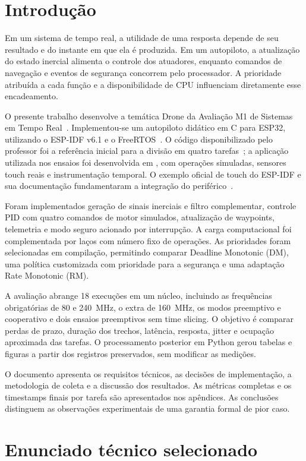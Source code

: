 \section{Introdução}
\label{sec:introducao}

Em um sistema de tempo real, a utilidade de uma resposta depende de seu resultado e do instante em que ela é produzida. Em um autopiloto, a atualização do estado inercial alimenta o controle dos atuadores, enquanto comandos de navegação e eventos de segurança concorrem pelo processador. A prioridade atribuída a cada função e a disponibilidade de CPU influenciam diretamente esse encadeamento.

O presente trabalho desenvolve a temática Drone da Avaliação M1 de Sistemas em Tempo Real~\cite{viel_enunciado}. Implementou-se um autopiloto didático em C para ESP32, utilizando o ESP-IDF v6.1 e o FreeRTOS~\cite{espidf,idf_freertos}. O código disponibilizado pelo professor foi a referência inicial para a divisão em quatro tarefas~\cite{viel_codigo}; a aplicação utilizada nos ensaios foi desenvolvida em , com operações simuladas, sensores touch reais e instrumentação temporal. O exemplo oficial de touch do ESP-IDF e sua documentação fundamentaram a integração do periférico~\cite{idf_touch_example,idf_touch}.

Foram implementados geração de sinais inerciais e filtro complementar, controle PID com quatro comandos de motor simulados, atualização de waypoints, telemetria e modo seguro acionado por interrupção. A carga computacional foi complementada por laços com número fixo de operações. As prioridades foram selecionadas em compilação, permitindo comparar Deadline Monotonic (DM), uma política customizada com prioridade para a segurança e uma adaptação Rate Monotonic (RM).

A avaliação abrange 18 execuções em um núcleo, incluindo as frequências obrigatórias de 80 e 240~MHz, o extra de 160~MHz, os modos preemptivo e cooperativo e dois ensaios preemptivos sem time slicing. O objetivo é comparar perdas de prazo, duração dos trechos, latência, resposta, jitter e ocupação aproximada das tarefas. O processamento posterior em Python gerou tabelas e figuras a partir dos registros preservados, sem modificar as medições.

O documento apresenta os requisitos técnicos, as decisões de implementação, a metodologia de coleta e a discussão dos resultados. As métricas completas e os timestamps finais por tarefa são apresentados nos apêndices. As conclusões distinguem as observações experimentais de uma garantia formal de pior caso.

\section{Enunciado técnico selecionado}
\label{sec:enunciado}
